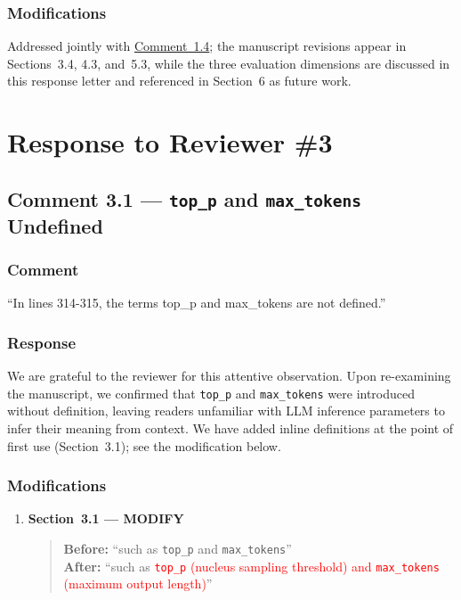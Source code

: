 \documentclass[11pt,a4paper]{article}
\begin{document}
\subsubsection{Modifications}
Addressed jointly with \hyperref[subsec:comment1.4]{Comment~1.4}; the manuscript revisions appear in Sections~3.4, 4.3, and~5.3, while the three evaluation dimensions are discussed in this response letter and referenced in Section~6 as future work.

\newpage
\section{Response to Reviewer \#3}

\subsection{Comment 3.1 --- \texttt{top\_p} and \texttt{max\_tokens} Undefined}

\subsubsection{Comment}
``In lines 314-315, the terms top\_p and max\_tokens are not defined.''

\subsubsection{Response}
We are grateful to the reviewer for this attentive observation. Upon re-examining the manuscript, we confirmed that \texttt{top\_p} and \texttt{max\_tokens} were introduced without definition, leaving readers unfamiliar with LLM inference parameters to infer their meaning from context. We have added inline definitions at the point of first use (Section~3.1); see the modification below.

\subsubsection{Modifications}
\begin{enumerate}
\item \textbf{Section~3.1 --- MODIFY}
\begin{quote}
\textbf{Before:} ``such as \texttt{top\_p} and \texttt{max\_tokens}''\\[4pt]
\textbf{After:} ``such as \textcolor{red}{\texttt{top\_p} (nucleus sampling threshold) and \texttt{max\_tokens} (maximum output length)}''
\end{quote}
\end{enumerate}
\end{document}
